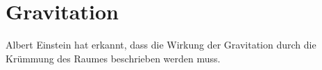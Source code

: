 %
%
%
\section{Gravitation%
\label{skript:kruemmusng:sectipn:gravitation}}
Albert Einstein hat erkannt, dass die Wirkung der Gravitation 
durch die Krümmung des Raumes beschrieben werden muss.

%
%
